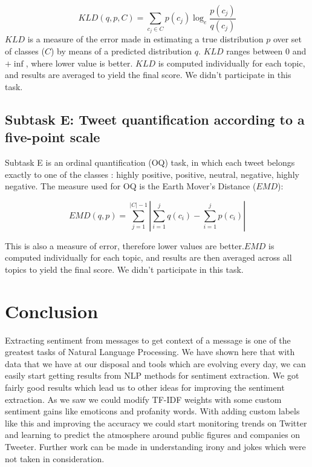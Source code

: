 \documentclass[runningheads,a4paper]{llncs}
\begin{document}
\begin{equation}
KLD(q, p, C) = \sum_{c_j \in C}p(c_j)\log_e\frac{p(c_j)}{q(c_j)}
\end{equation}
$KLD$ is a measure of the error made in estimating a true distribution $p$ over set of classes ($C$) by means of a predicted distribution $q$. $KLD$ ranges between 0 and $+\inf$, where lower value is better. $KLD$ is computed individually for each topic, and results are averaged to yield the final score. We didn't participate in this task.

\subsection{Subtask E: Tweet quantification according to a five-point scale}

Subtask E is an ordinal quantification (OQ) task, in which each tweet belongs exactly to one of the classes : highly positive, positive, neutral, negative, highly negative. The measure used for OQ is the Earth Mover's Distance ($EMD$):  

\begin{equation}
EMD(q, p) = \sum_{j=1}^{|C| - 1}|\sum_{i=1}^jq(c_i) - \sum_{i=1}^jp(c_i)|
\end{equation}

This is also a measure of error, therefore lower values are better.$EMD$ is computed individually for each topic, and results are then averaged across all topics to yield the final score. We didn't participate in this task.

\section{Conclusion}
Extracting sentiment from messages to get context of a message is one of the greatest tasks of Natural Language Processing. We have shown here that with data that we have at our disposal and tools which are evolving every day, we can easily start getting results from NLP methods for sentiment extraction. We got fairly good results which lead us to other ideas for improving the sentiment extraction. As we saw we could modify TF-IDF weights with some custom sentiment gains like emoticons and profanity words. With adding custom labels like this and improving the accuracy we could start monitoring trends on Twitter and learning to predict the atmosphere around public figures and companies on Tweeter. Further work can be made in understanding irony and jokes which were not taken in consideration.




\end{document}
